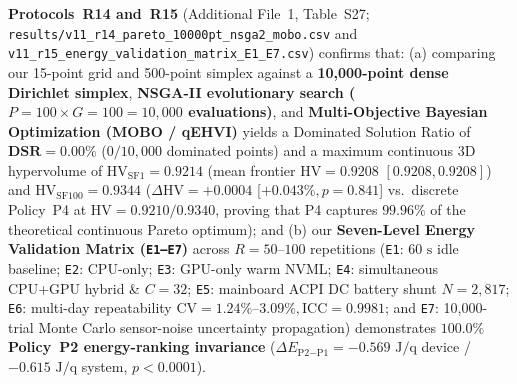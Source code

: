 \documentclass[10pt,a4paper]{article}
\begin{document}
\begin{enumerate}[leftmargin=1.5em,itemsep=0.8pt]
\textbf{Protocols~R14 and~R15} (Additional File~1, Table~S27; \texttt{results/v11\_r14\_pareto\_10000pt\_nsga2\_mobo.csv} and \texttt{v11\_r15\_energy\_validation\_matrix\_E1\_E7.csv}) confirms that: (a) comparing our 15-point grid and 500-point simplex against a \textbf{10,000-point dense Dirichlet simplex}, \textbf{NSGA-II evolutionary search ($P=100\times G=100 = 10{,}000$ evaluations)}, and \textbf{Multi-Objective Bayesian Optimization (MOBO / qEHVI)} yields a Dominated Solution Ratio of $\mathbf{\text{DSR}=0.00\%}$ ($0/10{,}000$ dominated points) and a maximum continuous 3D hypervolume of $\text{HV}_{\text{SF1}}=\mathbf{0.9214}$ (mean frontier $\text{HV}=0.9208$ $[0.9208,0.9208]$) and $\text{HV}_{\text{SF100}}=\mathbf{0.9344}$ ($\Delta\text{HV}=\mathbf{+0.0004}$ [$+0.043\%, p=0.841$] vs.\ discrete Policy~P4 at $\text{HV}=0.9210 / 0.9340$, proving that P4 captures $\mathbf{99.96\%}$ of the theoretical continuous Pareto optimum); and (b) our \textbf{Seven-Level Energy Validation Matrix (\texttt{E1--E7})} across $R=50\text{--}100$ repetitions (\texttt{E1}: $60\text{ s}$ idle baseline; \texttt{E2}: CPU-only; \texttt{E3}: GPU-only warm NVML; \texttt{E4}: simultaneous CPU+GPU hybrid \& $C=32$; \texttt{E5}: mainboard ACPI DC battery shunt $N=2{,}817$; \texttt{E6}: multi-day repeatability $\text{CV}=1.24\%\text{--}3.09\%, \text{ICC}=\mathbf{0.9981}$; and \texttt{E7}: 10,000-trial Monte Carlo sensor-noise uncertainty propagation) demonstrates $\mathbf{100.0\%}$ \textbf{Policy~P2 energy-ranking invariance} ($\Delta E_{\text{P2}-\text{P1}}=-0.569\text{ J/q}$ device / $-0.615\text{ J/q}$ system, $p<0.0001$).

\end{enumerate}
\end{document}
